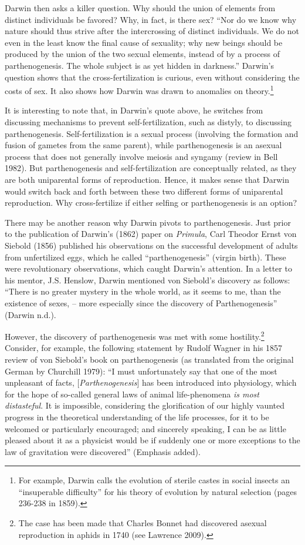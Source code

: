 \documentclass[
  letterpaper,
]{book}
\begin{document}
Darwin then asks a killer question. Why should the union of elements
from distinct individuals be favored? Why, in fact, is there sex? ``Nor
do we know why nature should thus strive after the intercrossing of
distinct individuals. We do not even in the least know the final cause
of sexuality; why new beings should be produced by the union of the two
sexual elements, instead of by a process of parthenogenesis. The whole
subject is as yet hidden in darkness.'' Darwin's question shows that the
cross-fertilization is curious, even without considering the costs of
sex. It also shows how Darwin was drawn to anomalies on
theory.\footnote{For example, Darwin calls the evolution of sterile
  castes in social insects an ``insuperable difficulty'' for his theory
  of evolution by natural selection (pages 236-238 in 1859).}

It is interesting to note that, in Darwin's quote above, he switches
from discussing mechanisms to prevent self-fertilization, such as
distyly, to discussing parthenogenesis. Self-fertilization is a sexual
process (involving the formation and fusion of gametes from the same
parent), while parthenogenesis is an asexual process that does not
generally involve meiosis and syngamy (review in Bell 1982). But
parthenogenesis and self-fertilization are conceptually related, as they
are both uniparental forms of reproduction. Hence, it makes sense that
Darwin would switch back and forth between these two different forms of
uniparental reproduction. Why cross-fertilize if either selfing or
parthenogenesis is an option?

There may be another reason why Darwin pivots to parthenogenesis. Just
prior to the publication of Darwin's (1862) paper on \emph{Primula},
Carl Theodor Ernst von Siebold (1856) published his observations on the
successful development of adults from unfertilized eggs, which he called
``parthenogenesis'' (virgin birth). These were revolutionary
observations, which caught Darwin's attention. In a letter to his
mentor, J.S. Henslow, Darwin mentioned von Siebold's discovery as
follows: ``There is no greater mystery in the whole world, as it seems
to me, than the existence of sexes, -- more especially since the
discovery of Parthenogenesis'' (Darwin n.d.).

However, the discovery of parthenogenesis was met with some
hostility.\footnote{The case has been made that Charles Bonnet had
  discovered asexual reproduction in aphids in 1740 (see Lawrence 2009).}
Consider, for example, the following statement by Rudolf Wagner in his
1857 review of von Siebold's book on parthenogenesis (as translated from
the original German by Churchill 1979): ``I must unfortunately say that
one of the most unpleasant of facts, {[}\emph{Parthenogenesis}{]} has
been introduced into physiology, which for the hope of so-called general
laws of animal life-phenomena \emph{is most distasteful}. It is
impossible, considering the glorification of our highly vaunted progress
in the theoretical understanding of the life processes, for it to be
welcomed or particularly encouraged; and sincerely speaking, I can be as
little pleased about it as a physicist would be if suddenly one or more
exceptions to the law of gravitation were discovered'' (Emphasis added).
\end{document}
